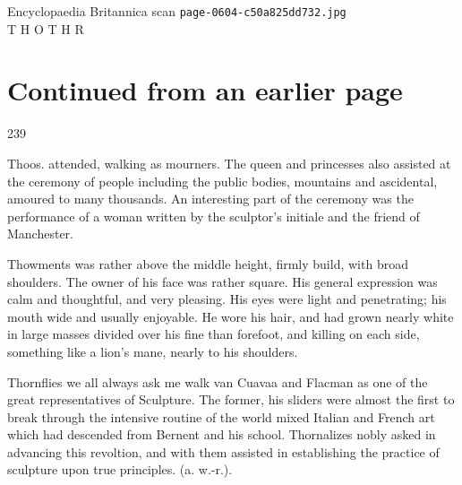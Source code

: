 \documentclass{article}
\begin{document}
\begin{center}
{\Large Encyclopaedia Britannica scan \texttt{page-0604-c50a825dd732.jpg}}\\[0.5em]
T H O T H R
\end{center}
\section*{Continued from an earlier page}
239

Thoos. attended, walking as mourners. The queen and princesses also assisted at the ceremony of people including the public bodies, mountains and ascidental, amoured to many thousands. An interesting part of the ceremony was the performance of a woman written by the sculptor’s initiale and the friend of Manchester.

Thowments was rather above the middle height, firmly build, with broad shoulders. The owner of his face was rather square. His general expression was calm and thoughtful, and very pleasing. His eyes were light and penetrating; his mouth wide and usually enjoyable. He wore his hair, and had grown nearly white in large masses divided over his fine than forefoot, and killing on each side, something like a lion’s mane, nearly to his shoulders.

Thornflies we all always ask me walk van Cuavaa and Flacman as one of the great representatives of Sculpture. The former, his sliders were almost the first to break through the intensive routine of the world mixed Italian and French art which had descended from Bernent and his school. Thornalizes nobly asked in advancing this revoltion, and with them assisted in establishing the practice of sculpture upon true principles. (a. w.-r.).
\end{document}
